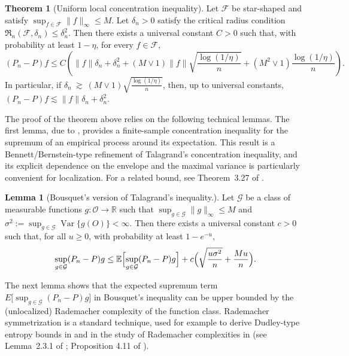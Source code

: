 \documentclass[11pt]{article}
\theoremstyle{plain}
\theoremstyle{definition} %
\newtheorem{theorem}{Theorem}
\newtheorem{lemma}{Lemma}
\newcommand{\Var}{\operatorname{Var}}
\begin{document}
 

\begin{theorem}[Uniform local concentration inequality]\label{theorem:loc_max_ineq}
Let $\mathcal{F}$ be star-shaped and satisfy $\sup_{f\in\mathcal{F}}\|f\|_\infty\le M$.
Let $\delta_n>0$ satisfy the critical radius condition
$\mathfrak{R}_n(\mathcal{F},\delta_n)\le \delta_n^2$.
Then there exists a universal constant $C>0$ such that, with probability at least $1-\eta$, for every $f\in\mathcal{F}$,
\[
(P_n-P)f
\leq
C \left( \|f\|\delta_n
+
\delta_n^2
+
(M \vee 1) \|f\| \sqrt{\frac{\log(1/\eta)}{n}}
+
(M^2 \vee 1)\frac{\log(1/\eta)}{n} \right).
\]
In particular, if $\delta_n \ \gtrsim\ (M \vee 1)\sqrt{\frac{\log(1/\eta)}{n}}$, then, up to universal constants, $(P_n-P)f
\lesssim
\|f\|\delta_n
+
\delta_n^2.$
\end{theorem}







The proof of the theorem above relies on the following technical lemmas. The first lemma, due to \citet{bousquet2002bennett}, provides a finite-sample concentration inequality for the supremum of an empirical process around its expectation. This result is a Bennett/Bernstein-type refinement of Talagrand's concentration inequality, and its explicit dependence on the envelope and the maximal variance is particularly convenient for localization. For a related bound, see Theorem~3.27 of \cite{wainwright2019high}.


 


\begin{lemma}[Bousquet’s version of Talagrand’s inequality.]\label{lem:bousquet}
 Let $\mathcal{G}$ be a class of measurable
functions $g:\mathcal{O}\to\mathbb{R}$ such that
$\sup_{g\in\mathcal{G}}\|g\|_\infty \le M$ and
$\sigma^2 := \sup_{g\in\mathcal{G}} \Var\{g(O)\} < \infty$.
Then there exists a universal constant $c>0$ such that, for all $u\ge 0$, with
probability at least $1-e^{-u}$,
\[
\sup_{g\in\mathcal{G}} (P_n-P)g
\le
\mathbb{E}\Bigl[\sup_{g\in\mathcal{G}} (P_n-P)g\Bigr]
+
c\Bigl(
  \sqrt{\frac{u\sigma^2}{n}}
  + \frac{Mu}{n}
\Bigr).
\]
\end{lemma}

The next lemma shows that the expected supremum term $E\bigl[\sup_{g\in\mathcal{G}} (P_n-P)g\bigr]$ in Bousquet's inequality can be upper bounded by the (unlocalized) Rademacher complexity of the function class. Rademacher symmetrization is a standard technique, used for example to derive Dudley-type entropy bounds in \citet{van1996weak} and in the study of Rademacher complexities in \citet{bartlett2002rademacher}  (see Lemma~2.3.1 of \citet{van1996weak}; Proposition 4.11 of \citet{wainwright2019high}). 
\end{document}
